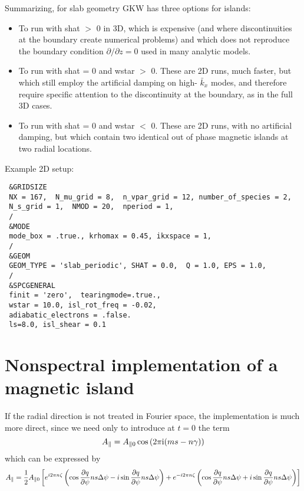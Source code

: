 Summarizing, for slab geometry GKW  has three options for islands:
\begin{itemize}
\item To run with shat $>$ 0 in 3D, which is expensive (and where
discontinuities at the boundary create numerical problems) and which does not
reproduce the boundary condition $\partial / \partial z =0$ used in many analytic models.
\item To run with shat = 0 and wstar $>$ 0. These are 2D runs, much faster, but which still
employ the artificial damping on high- ${\bar k}_x$ modes, and therefore require
specific attention to the discontinuity at the boundary, as in the full 3D cases.
\item To run with shat = 0 and wstar $<$  0. These are 2D runs, with no
artificial damping, but which contain two identical out of phase magnetic
islands at two radial locations.
\end{itemize}

Example 2D setup:
\begin{small}
\begin{verbatim}
 &GRIDSIZE
 NX = 167,  N_mu_grid = 8,  n_vpar_grid = 12, number_of_species = 2,
 N_s_grid = 1,  NMOD = 20,  nperiod = 1,
 /
 &MODE
 mode_box = .true., krhomax = 0.45, ikxspace = 1,
 /
 &GEOM
 GEOM_TYPE = 'slab_periodic', SHAT = 0.0,  Q = 1.0, EPS = 1.0,
 /
 &SPCGENERAL
 finit = 'zero',  tearingmode=.true.,
 wstar = 10.0, isl_rot_freq = -0.02,
 adiabatic_electrons = .false.
 ls=8.0, isl_shear = 0.1
\end{verbatim}
\end{small}

\section{Nonspectral implementation of a magnetic island}

If the radial direction is not treated in Fourier space, the implementation is much more direct, since we need only to introduce at $t=0$ the term
\begin{equation}
A_\parallel = A_{\parallel 0}\cos\left(2 \pi {\rm i} (m s - n \gamma )\right)
\end{equation}
which can be expressed by
\begin{equation}
A_\parallel = {1\over 2}A_{\parallel 0}\left[e^{i2\pi n\zeta}\left(\cos{\partial q \over \partial \psi} n s \Delta\psi - i\sin{\partial q \over \partial \psi} n s \Delta\psi\right)
+ e^{-i2\pi n\zeta}\left(\cos{\partial q \over \partial \psi} n s \Delta\psi + i\sin{\partial q \over \partial \psi} n s \Delta\psi\right)\right]
\end{equation}

